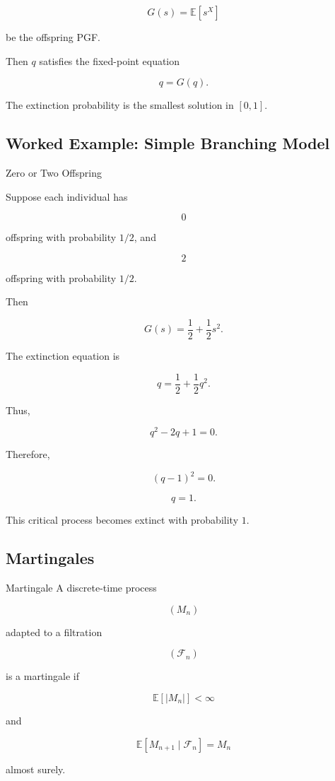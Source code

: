 \[
G(s)
=
\mathbb{E}[s^X]
\]

be the offspring PGF.

Then \(q\) satisfies the fixed-point equation

\[
\boxed{
q
=
G(q).
}
\]

The extinction probability is the smallest solution in \([0,1]\).

\subsection{Worked Example: Simple Branching Model}
\label{subsec:worked-branching-extinction}

\begin{workedexamplebox}{Zero or Two Offspring}

Suppose each individual has

\[
0
\]

offspring with probability \(1/2\), and

\[
2
\]

offspring with probability \(1/2\).

Then

\[
G(s)
=
\frac12
+
\frac12s^2.
\]

The extinction equation is

\[
q
=
\frac12
+
\frac12q^2.
\]

Thus,

\[
q^2-2q+1=0.
\]

Therefore,

\[
(q-1)^2=0.
\]

\begin{answerbox}
\[
\boxed{
q=1.
}
\]
\end{answerbox}

This critical process becomes extinct with probability \(1\).

\end{workedexamplebox}

\subsection{Martingales}
\label{subsec:martingales-stochastic-processes}

\begin{definitionbox}{Martingale}
A discrete-time process

\[
(M_n)
\]

adapted to a filtration

\[
(\mathcal{F}_n)
\]

is a martingale if

\[
\mathbb{E}[|M_n|]<\infty
\]

and

\[
\boxed{
\mathbb{E}
[
M_{n+1}
\mid
\mathcal{F}_n
]
=
M_n
}
\]

almost surely.
\end{definitionbox}

